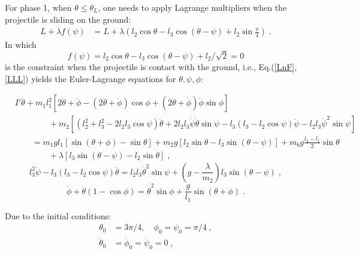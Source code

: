 \documentclass[%
reprint,
amsmath,amssymb,
aps,
]{revtex4-1}
\begin{document}
	For phase 1, when $\theta \le \theta_L$, one needs to apply Lagrange multipliers when the projectile is sliding on the ground:
	\begin{equation}\label{LnF}
	\begin{aligned}
	L + \lambda f(\psi) &= 
	L + \lambda \left(l_2\cos \theta 
	- l_3\cos(\theta - \psi) + l_2\sin\frac{\pi}{4}\right)
	\;.
	\end{aligned}
	\end{equation}
	In which
	\begin{equation}\label{constr}
	f(\psi)=l_2\cos \theta 
	- l_3\cos(\theta - \psi) + l_2/\sqrt{2} = 0
	\end{equation}
	is the constraint when the projectile is contact with the ground,
	i.e., Eq.(\ref{LnF},\ref{LLL}) yields the Euler-Lagrange equations for $\theta,\psi,\phi$:
	\begin{widetext}
		\begin{equation}\label{eom01}
		\begin{aligned}
		&I'\ddot{\theta}
		+
		m_1l_1^2\left[
		2\ddot{\theta} + \ddot{\phi} - (2\ddot{\theta}+\ddot{\phi})\cos\phi + (2\dot{\theta}+\dot{\phi})\dot{\phi} \sin\phi 
		\right]
		\\&\qquad\qquad
		+
		m_2\left[
		(l_2^2+l_3^2-2l_2l_3\cos\psi)\ddot{\theta} + 2l_2l_3\dot{\psi}\dot{\theta}\sin\psi
		-
		l_3(l_3 - l_2\cos\psi)\ddot{\psi} - l_2l_3\dot{\psi}^2\sin\psi
		\right]
		\\&\qquad
		=
		m_1gl_1\left[\sin(\theta+\phi) - \sin\theta\right] + m_2g\left[l_2\sin\theta - l_3 \sin(\theta - \psi)\right]
		+
		m_bg\frac{l_2 - l_1}{2}\sin\theta
		\\&\qquad\qquad
		+
		\lambda\left[
		l_3\sin(\theta - \psi) - l_2\sin\theta
		\right]\;,
		\end{aligned}
		\end{equation}
		\begin{equation}\label{eom02}
		l_3^2\ddot{\psi} - l_3(l_3 -l_2\cos\psi)\ddot{\theta} 
		=
		l_2 l_3 \dot{\theta}^2 \sin\psi + \left(g-\frac{\lambda}{m_2}\right)l_3 \sin(\theta - \psi) \;,
		\end{equation}
		\begin{equation}\label{eom03}
		\ddot{\phi} + \ddot{\theta}(1-\cos\phi)  
		=\dot{\theta}^2\sin\phi
		+\frac{g}{l_1}\sin(\theta+\phi)\;.
		\end{equation}
	\end{widetext}
	Due to the initial conditions:
	\begin{equation}
	\begin{aligned}
	\theta_0 &= 3\pi/4,\quad
	\phi_0 = \psi_0 = \pi/4\;,\\
	\dot{\theta}_0 &= \dot{\phi}_0 =\dot{\psi}_0 = 0\;,
	\end{aligned}
	\end{equation}
\end{document}
